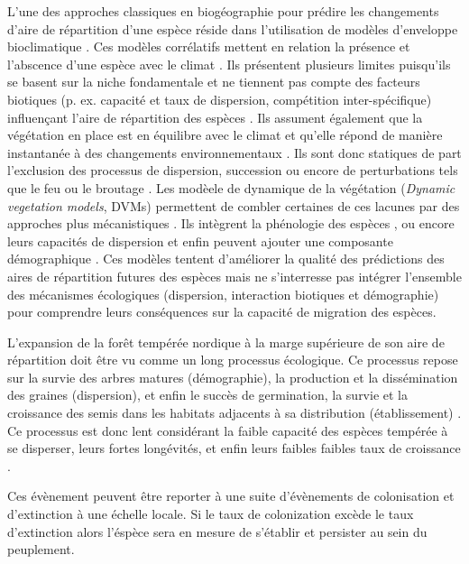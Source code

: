 L'une des approches classiques en biogéographie pour prédire les changements d'aire de répartition
d'une espèce réside dans l'utilisation de modèles d'enveloppe bioclimatique \citep{Pearson2003b}.
Ces modèles corrélatifs mettent en relation la présence et l'abscence d'une espèce avec le climat
\citep{Guisan2005a}. Ils présentent plusieurs limites puisqu'ils se basent sur la niche fondamentale
et ne tiennent pas compte des facteurs biotiques (p. ex. capacité et taux de dispersion, compétition
inter-spécifique) influençant l'aire de répartition des espèces \citep{Guisan2005a,Pearson2003b}.
Ils assument également que la végétation en place est en équilibre avec le climat et qu'elle répond
de manière instantanée à des changements environnementaux \citep{Austin2002}. Ils sont donc
statiques de part l'exclusion des processus de dispersion, succession ou encore de perturbations
tels que le feu ou le broutage \citep{Austin2002,Guisan2005a}. Les modèele de dynamique de la
végétation (\textit{Dynamic vegetation models}, DVMs) permettent de combler certaines de ces lacunes
par des approches plus mécanistiques \citep{Snell2014a}. Ils intègrent la phénologie des espèces
\citep{Letters2001,Morin2008}, ou encore leurs capacités de dispersion \citep{Nobis2014,Iverson2004}
et enfin peuvent ajouter une composante démographique \citep{Lischke2006a,Vanderwel2014}. Ces
modèles tentent d'améliorer la qualité des prédictions des aires de répartition futures des espèces
mais ne s'interresse pas intégrer l'ensemble des mécanismes écologiques (dispersion, interaction
biotiques et démographie) pour comprendre leurs conséquences sur la capacité de migration des
espèces. 

L'expansion de la forêt tempérée nordique à la marge supérieure de son aire de répartition doit être
vu comme un long processus écologique. Ce processus repose sur la survie des arbres matures
(démographie), la production et la dissémination des graines (dispersion), et enfin le succès de
germination, la survie et la croissance des semis dans les habitats adjacents à sa distribution
(établissement) \citep{Schurr2012,Travis2013}. Ce processus est donc lent considérant la faible
capacité des espèces tempérée à se disperser, leurs fortes longévités, et enfin leurs faibles
faibles taux de croissance \citep{Renwick2014,Vanderwel2014}.

Ces évènement peuvent être reporter à une suite d'évènements de colonisation et d'extinction à une échelle locale. Si le taux de colonization excède le taux d'extinction alors l'éspèce sera en mesure de s'établir et persister au sein du peuplement.  

